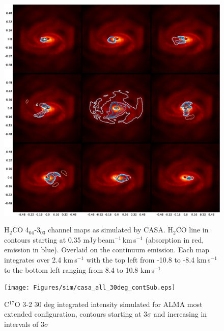 \documentclass[useAMS,usenatbib]{mn2e}
\begin{document}
\begin{figure}
 \includegraphics[width=168mm]{Figures/sim/channel_map-1.eps} 
 \label{h2co_chanmap}
 \caption{H$_2$CO 4$_{04}$-3$_{03}$ channel maps as simulated by CASA. H$_2$CO line in contours starting at 0.35 mJy$\,$beam$^{-1}\,$km$\,$s$^{-1}$ (absorption in red, emission in blue). Overlaid on the continuum emission. Each map integrates over 2.4 km$\,$s$^{-1}$ with the top left from -10.8 to -8.4 km$\,$s$^{-1}$ to the bottom left ranging from 8.4 to 10.8 km$\,$s$^{-1}$}
\end{figure}



%

\begin{figure}
 \texttt{[image: Figures/sim/casa\_all\_30deg\_contSub.eps]}

 \caption{C$^{17}$O 3-2 30 deg integrated intensity simulated for ALMA most extended configuration, contours starting at 3$\sigma$ and increasing in intervals of 3$\sigma$}
\end{figure}
\end{document}
